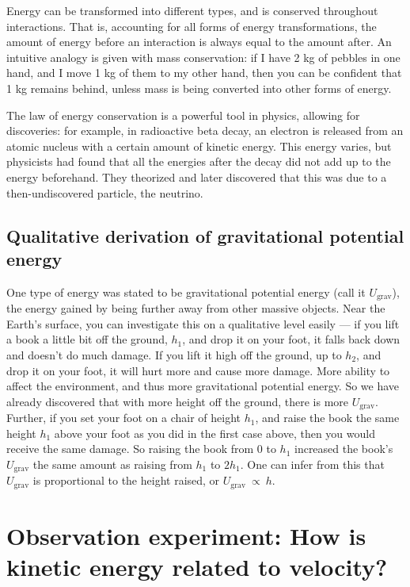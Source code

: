 Energy can be transformed into different types, and is conserved throughout interactions. That is, accounting for all forms of energy transformations, the amount of energy before an interaction is always equal to the amount after. An intuitive analogy is given with mass conservation: if I have 2 kg of pebbles in one hand, and I move 1 kg of them to my other hand, then you can be confident that 1 kg remains behind, unless mass is being converted into other forms of energy.

The law of energy conservation is a powerful tool in physics, allowing for discoveries: for example, in radioactive beta decay, an electron is released from an atomic nucleus with a certain amount of kinetic energy. This energy varies, but physicists had found that all the energies after the decay did not add up to the energy beforehand. They theorized and later discovered that this was due to a then-undiscovered particle, the neutrino.

\subsection{Qualitative derivation of gravitational potential energy}

One type of energy was stated to be gravitational potential energy (call it $U_\mathrm{grav}$), the energy gained by being further away from other massive objects. Near the Earth's surface, you can investigate this on a qualitative level easily --- if you lift a book a little bit off the ground, $h_1$, and drop it on your foot, it falls back down and doesn't do much damage. If you lift it high off the ground, up to $h_2$, and drop it on your foot, it will hurt more and cause more damage. More ability to affect the environment, and thus more gravitational potential energy. So we have already discovered that with more height off the ground, there is more $U_\mathrm{grav}$. Further, if you set your foot on a chair of height $h_1$, and raise the book the same height $h_1$ above your foot as you did in the first case above, then you would receive the same damage. So raising the book from 0 to $h_1$ increased the book's $U_\mathrm{grav}$ the same amount as raising from $h_1$ to $2h_1$. One can infer from this that $U_\mathrm{grav}$ is proportional to the height raised, or $U_\mathrm{grav}\: \propto\: h$.

\section{Observation experiment: How is kinetic energy related to velocity?}

